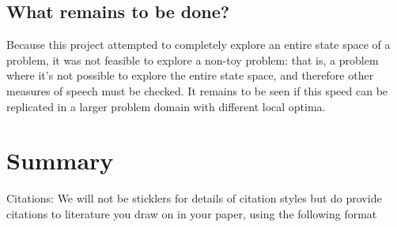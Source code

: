 \documentclass[12pt]{article}
\begin{document}

\subsection*{What remains to be done?}
Because this project attempted to completely explore an entire state space of a problem, it was not feasible to explore a non-toy problem: that is, a problem where it's not possible to explore the entire state space, and therefore other measures of speech must be checked. It remains to be seen if this speed can be replicated in a larger problem domain with different local optima.


\section{Summary}

Citations:   We will not be sticklers for details of citation styles but do provide citations to literature you draw on in your paper, using the following format
\end{document}
